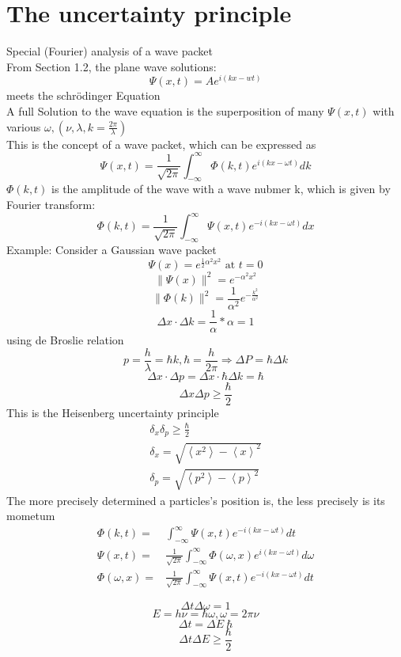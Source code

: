 \documentclass[12pt, a4paper]{article}
\begin{document}
\section{The uncertainty principle}
Special (Fourier) analysis of a wave packet\\
From Section 1.2, the plane wave solutions:$$\Psi(x,t)=Ae^{i(kx-wt)}$$ meets the schr\"odinger Equation\\
A full Solution to the wave equation is the superposition of many $\Psi(x,t)$ with various $\omega,(\nu, \lambda, k=\frac{2\pi}{\lambda})$ \\
This is the concept of a wave packet, which can be expressed as $$\Psi(x,t)=\frac{1}{\sqrt{2\pi}}\int_{-\infty}^{\infty}\Phi(k,t)e^{i(kx-\omega t)}dk$$ $\Phi(k,t)$ is the amplitude of the wave with a wave nubmer k, which is given by Fourier transform:
$$\Phi(k,t)=\frac{1}{\sqrt{2\pi}}\int_{-\infty}^{\infty}\Psi(x,t)e^{-i(kx-\omega t)}dx$$
Example: Consider a Gaussian wave packet
$$\Psi(x)=e^{\frac{1}{2}\alpha^2 x^2} \text{ at } t = 0$$
$$\|\Psi(x)\|^2=e^{-\alpha^2 x^2}$$
$$\|\Phi(k)\|^2=\frac{1}{\alpha^2}e^{-\frac{k^2}{\alpha^2}}$$
$$\Delta x \cdot \Delta k=\frac{1}{\alpha}*\alpha=1$$
using de Broslie relation $$p=\frac{h}{\lambda}=\hbar k,\hbar=\frac{h}{2\pi} \Rightarrow \Delta P = \hbar \Delta k$$
$$\Delta x \cdot \Delta p=\Delta x \cdot \hbar \Delta k=\hbar$$
\begin{equation}
\Delta x \Delta p \geq \frac{\hbar}{2}
\end{equation}
This is the Heisenberg uncertainty principle
\begin{align*}
\delta_x \delta_p \geq \frac{\hbar}{2}\\
\delta_x=\sqrt{\left< x^2 \right> - \left< x \right> ^2}\\
\delta_p=\sqrt{\left< p^2 \right> - \left< p \right> ^2}
\end{align*}
The more  precisely determined a particles's position is, the less precisely is its mometum
\begin{align*}
\Phi(k,t)=&\int_{-\infty}^{\infty} \Psi(x,t) e^{-i(kx-\omega t)}dt\\
\Psi(x,t)=&\frac{1}{\sqrt{2\pi}}\int_{-\infty}^{\infty}\Phi(\omega, x) e^{i(kx-\omega t)}d\omega\\
\Phi(\omega, x)=&\frac{1}{\sqrt{2\pi}}\int_{-\infty}^{\infty}\Psi(x,t) e^{-i(kx-\omega t)}dt
\end{align*}

$$\Delta t\Delta\omega=1$$
$$E=h\nu=\hbar \omega,\omega = 2\pi \nu$$
$$\Delta t=\Delta E ~ \hbar$$
$$\Delta t\Delta E \geq \frac{\hbar}{2}$$
\end{document}
